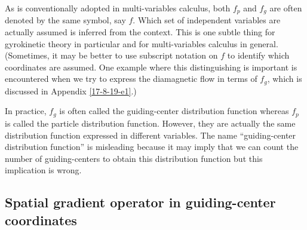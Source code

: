\documentclass{article}
\begin{document}
As is conventionally adopted in multi-variables calculus, both $f_p$ and $f_g$
are often denoted by the same symbol, say $f$. Which set of independent
variables are actually assumed is inferred from the context. This is one
subtle thing for gyrokinetic theory in particular and for multi-variables
calculus in general. (Sometimes, it may be better to use subscript notation on
$f$ to identify which coordinates are assumed. One example where this
distinguishing is important is encountered when we try to express the
diamagnetic flow in terms of $f_g$, which is discussed in Appendix
\ref{17-8-19-e1}.)

In practice, $f_g$ is often called the guiding-center distribution function
whereas $f_p$ is called the particle distribution function. However, they are
actually the same distribution function expressed in different variables. The
name ``guiding-center distribution function'' is misleading because it may
imply that we can count the number of guiding-centers to obtain this
distribution function but this implication is wrong.

\subsection{Spatial gradient operator in guiding-center coordinates}
\end{document}
